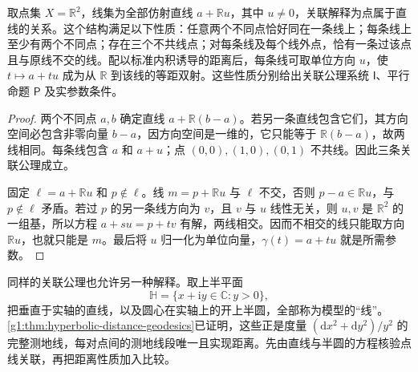 \begin{proposition}
	\label{g1:prop:euclidean-incidence-model}
	取点集 \(X=\mathbb R^2\)，线集为全部仿射直线 \(a+\mathbb R u\)，其中 \(u\ne0\)，关联解释为点属于直线的关系。这个结构满足以下性质：任意两个不同点恰好同在一条线上；每条线上至少有两个不同点；存在三个不共线点；对每条线及每个线外点，恰有一条过该点且与原线不交的线。配以标准内积诱导的距离后，每条线可取单位方向 \(u\)，使 \(t\mapsto a+tu\) 成为从 \(\mathbb R\) 到该线的等距双射。这些性质分别给出关联公理系统 \(\mathsf I\)、平行命题 \(\mathsf P\) 及实参数条件。
\end{proposition}
\begin{proof}
	两个不同点 \(a,b\) 确定直线 \(a+\mathbb R(b-a)\)。若另一条直线包含它们，其方向空间必包含非零向量 \(b-a\)，因方向空间是一维的，它只能等于 \(\mathbb R(b-a)\)，故两线相同。每条线包含 \(a\) 和 \(a+u\)；点 \((0,0),(1,0),(0,1)\) 不共线。因此三条关联公理成立。

	固定 \(\ell=a+\mathbb R u\) 和 \(p\notin\ell\)。线 \(m=p+\mathbb R u\) 与 \(\ell\) 不交，否则 \(p-a\in\mathbb R u\)，与 \(p\notin\ell\) 矛盾。若过 \(p\) 的另一条线方向为 \(v\)，且 \(v\) 与 \(u\) 线性无关，则 \(u,v\) 是 \(\mathbb R^2\) 的一组基，所以方程 \(a+su=p+tv\) 有解，两线相交。因而不相交的线只能取方向 \(\mathbb R u\)，也就只能是 \(m\)。最后将 \(u\) 归一化为单位向量，\(\gamma(t)=a+tu\) 就是所需参数。
\end{proof}

同样的关联公理也允许另一种解释。取上半平面
\[
	\mathbb H=\{x+\mathrm i y\in\mathbb C:y>0\},
\]
把垂直于实轴的直线，以及圆心在实轴上的开上半圆，全部称为模型的“线”。\cref{g1:thm:hyperbolic-distance-geodesics}已证明，这些正是度量 \((\mathrm dx^2+\mathrm dy^2)/y^2\) 的完整测地线，每对点间的测地线段唯一且实现距离。先由直线与半圆的方程核验点线关联，再把距离性质加入比较。

